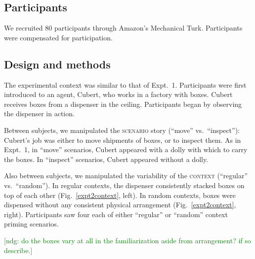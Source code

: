 \documentclass[linguex]{sp}
\newcommand{\ndg}[1]{\textcolor{Green}{[ndg: #1]}}
\begin{document}
\subsection{Participants}

We recruited 80 participants through Amazon's Mechanical Turk. Participants were compensated for participation.

\subsection{Design and methods}

The experimental context was similar to that of Expt.~1. Participants were first introduced to an agent, Cubert, who works in a factory with boxes. Cubert receives boxes from a dispenser in the ceiling. Participants began by observing the dispenser in action.

Between subjects, we manipulated the \textsc{scenario} story (``move'' vs.~``inspect''): Cubert's job was either to move shipments of boxes, or to inspect them. As in Expt.~1, in ``move'' scenarios, Cubert appeared with a dolly with which to carry the boxes. In ``inspect'' scenarios, Cubert appeared without a dolly.

Also between subjects, we manipulated the variability of the \textsc{context} (``regular'' vs.~``random''). In regular contexts, the dispenser consistently stacked boxes on top of each other (Fig.~\ref{expt2context}, left). In random contexts, boxes were dispensed without any consistent physical arrangement (Fig.\ \ref{expt2context}, right). Participants saw four each of either ``regular'' or ``random'' context priming scenarios.

\ndg{do the boxes vary at all in the familiarization aside from arrangement? if so describe.}
\end{document}
